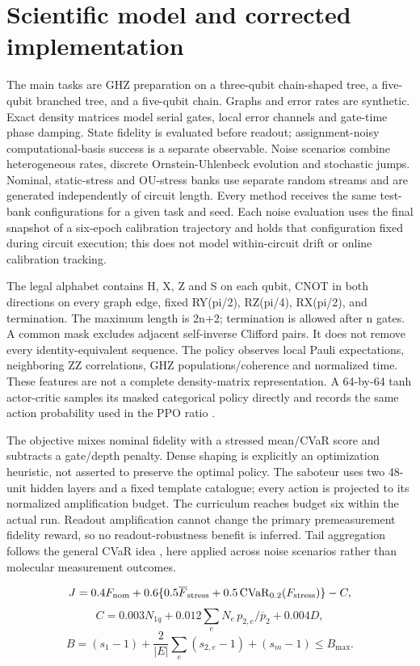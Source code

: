 \documentclass[11pt]{article}
\begin{document}
\section{Scientific model and corrected implementation}
The main tasks are GHZ preparation on a three-qubit chain-shaped tree, a five-qubit branched tree, and a five-qubit chain. Graphs and error rates are synthetic. Exact density matrices model serial gates, local error channels and gate-time phase damping. State fidelity is evaluated before readout; assignment-noisy computational-basis success is a separate observable. Noise scenarios combine heterogeneous rates, discrete Ornstein-Uhlenbeck evolution and stochastic jumps. Nominal, static-stress and OU-stress banks use separate random streams and are generated independently of circuit length. Every method receives the same test-bank configurations for a given task and seed. Each noise evaluation uses the final snapshot of a six-epoch calibration trajectory and holds that configuration fixed during circuit execution; this does not model within-circuit drift or online calibration tracking.

The legal alphabet contains H, X, Z and S on each qubit, CNOT in both directions on every graph edge, fixed RY(pi/2), RZ(pi/4), RX(pi/2), and termination. The maximum length is 2n+2; termination is allowed after n gates. A common mask excludes adjacent self-inverse Clifford pairs. It does not remove every identity-equivalent sequence. The policy observes local Pauli expectations, neighboring ZZ correlations, GHZ populations/coherence and normalized time. These features are not a complete density-matrix representation. A 64-by-64 tanh actor-critic samples its masked categorical policy directly and records the same action probability used in the PPO ratio \cite{ppo}.

The objective mixes nominal fidelity with a stressed mean/CVaR score and subtracts a gate/depth penalty. Dense shaping is explicitly an optimization heuristic, not asserted to preserve the optimal policy. The saboteur uses two 48-unit hidden layers and a fixed template catalogue; every action is projected to its normalized amplification budget. The curriculum reaches budget six within the actual run. Readout amplification cannot change the primary premeasurement fidelity reward, so no readout-robustness benefit is inferred. Tail aggregation follows the general CVaR idea \cite{cvar}, here applied across noise scenarios rather than molecular measurement outcomes.

\[
J=0.4F_{\rm nom}+0.6\{0.5\overline F_{\rm stress}+0.5\operatorname{CVaR}_{0.2}(F_{\rm stress})\}-C,
\]
\[
C=0.003N_{1q}+0.012\sum_e N_e\,p_{2,e}/\overline p_2+0.004D,
\]
\[
B=(s_1-1)+\frac{2}{|E|}\sum_e(s_{2,e}-1)+(s_m-1)\leq B_{\max}.
\]
\end{document}
